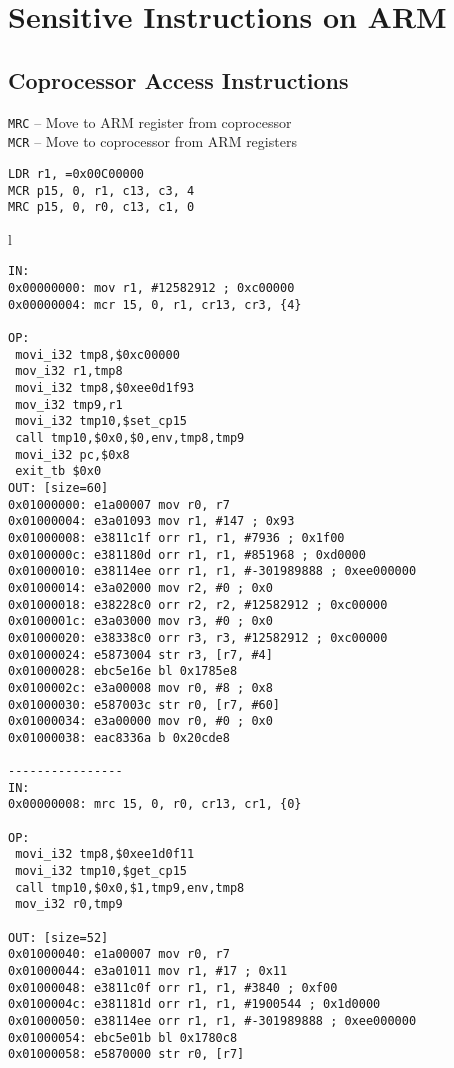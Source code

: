 \documentclass{report}
\begin{document}
\section*{Sensitive Instructions on ARM}
\subsection*{Coprocessor Access Instructions}
	{\tt MRC} -- Move to ARM register from coprocessor\\
	{\tt MCR} -- Move to coprocessor from ARM registers\\
\begin{lstlisting}
LDR r1, =0x00C00000            
MCR p15, 0, r1, c13, c3, 4
MRC p15, 0, r0, c13, c1, 0
\end{lstlisting}
\begin{tabular}{l}
\hline\noalign{\smallskip}
\begin{lstlisting}
IN:
0x00000000: mov r1, #12582912 ; 0xc00000
0x00000004: mcr 15, 0, r1, cr13, cr3, {4}

OP:
 movi_i32 tmp8,$0xc00000
 mov_i32 r1,tmp8
 movi_i32 tmp8,$0xee0d1f93
 mov_i32 tmp9,r1
 movi_i32 tmp10,$set_cp15
 call tmp10,$0x0,$0,env,tmp8,tmp9
 movi_i32 pc,$0x8
 exit_tb $0x0
OUT: [size=60]
0x01000000: e1a00007 mov r0, r7
0x01000004: e3a01093 mov r1, #147 ; 0x93
0x01000008: e3811c1f orr r1, r1, #7936 ; 0x1f00
0x0100000c: e381180d orr r1, r1, #851968 ; 0xd0000
0x01000010: e38114ee orr r1, r1, #-301989888 ; 0xee000000
0x01000014: e3a02000 mov r2, #0 ; 0x0
0x01000018: e38228c0 orr r2, r2, #12582912 ; 0xc00000
0x0100001c: e3a03000 mov r3, #0 ; 0x0
0x01000020: e38338c0 orr r3, r3, #12582912 ; 0xc00000
0x01000024: e5873004 str r3, [r7, #4]
0x01000028: ebc5e16e bl 0x1785e8
0x0100002c: e3a00008 mov r0, #8 ; 0x8
0x01000030: e587003c str r0, [r7, #60]
0x01000034: e3a00000 mov r0, #0 ; 0x0
0x01000038: eac8336a b 0x20cde8

----------------
IN:
0x00000008: mrc 15, 0, r0, cr13, cr1, {0}

OP:
 movi_i32 tmp8,$0xee1d0f11
 movi_i32 tmp10,$get_cp15
 call tmp10,$0x0,$1,tmp9,env,tmp8
 mov_i32 r0,tmp9

OUT: [size=52]
0x01000040: e1a00007 mov r0, r7
0x01000044: e3a01011 mov r1, #17 ; 0x11
0x01000048: e3811c0f orr r1, r1, #3840 ; 0xf00
0x0100004c: e381181d orr r1, r1, #1900544 ; 0x1d0000
0x01000050: e38114ee orr r1, r1, #-301989888 ; 0xee000000
0x01000054: ebc5e01b bl 0x1780c8
0x01000058: e5870000 str r0, [r7]
\end{lstlisting}
\end{tabular}
\end{document}
